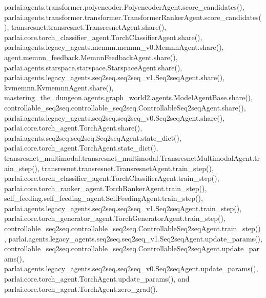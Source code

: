 parlai.\+agents.\+transformer.\+polyencoder.\+Polyencoder\+Agent.\+score\+\_\+candidates(), parlai.\+agents.\+transformer.\+transformer.\+Transformer\+Ranker\+Agent.\+score\+\_\+candidates(), transresnet.\+transresnet.\+Transresnet\+Agent.\+share(), parlai.\+core.\+torch\+\_\+classifier\+\_\+agent.\+Torch\+Classifier\+Agent.\+share(), parlai.\+agents.\+legacy\+\_\+agents.\+memnn.\+memnn\+\_\+v0.\+Memnn\+Agent.\+share(), agent.\+memnn\+\_\+feedback.\+Memnn\+Feedback\+Agent.\+share(), parlai.\+agents.\+starspace.\+starspace.\+Starspace\+Agent.\+share(), parlai.\+agents.\+legacy\+\_\+agents.\+seq2seq.\+seq2seq\+\_\+v1.\+Seq2seq\+Agent.\+share(), kvmemnn.\+Kvmemnn\+Agent.\+share(), mastering\+\_\+the\+\_\+dungeon.\+agents.\+graph\+\_\+world2.\+agents.\+Model\+Agent\+Base.\+share(), controllable\+\_\+seq2seq.\+controllable\+\_\+seq2seq.\+Controllable\+Seq2seq\+Agent.\+share(), parlai.\+agents.\+legacy\+\_\+agents.\+seq2seq.\+seq2seq\+\_\+v0.\+Seq2seq\+Agent.\+share(), parlai.\+core.\+torch\+\_\+agent.\+Torch\+Agent.\+share(), parlai.\+agents.\+seq2seq.\+seq2seq.\+Seq2seq\+Agent.\+state\+\_\+dict(), parlai.\+core.\+torch\+\_\+agent.\+Torch\+Agent.\+state\+\_\+dict(), transresnet\+\_\+multimodal.\+transresnet\+\_\+multimodal.\+Transresnet\+Multimodal\+Agent.\+train\+\_\+step(), transresnet.\+transresnet.\+Transresnet\+Agent.\+train\+\_\+step(), parlai.\+core.\+torch\+\_\+classifier\+\_\+agent.\+Torch\+Classifier\+Agent.\+train\+\_\+step(), parlai.\+core.\+torch\+\_\+ranker\+\_\+agent.\+Torch\+Ranker\+Agent.\+train\+\_\+step(), self\+\_\+feeding.\+self\+\_\+feeding\+\_\+agent.\+Self\+Feeding\+Agent.\+train\+\_\+step(), parlai.\+agents.\+legacy\+\_\+agents.\+seq2seq.\+seq2seq\+\_\+v1.\+Seq2seq\+Agent.\+train\+\_\+step(), parlai.\+core.\+torch\+\_\+generator\+\_\+agent.\+Torch\+Generator\+Agent.\+train\+\_\+step(), controllable\+\_\+seq2seq.\+controllable\+\_\+seq2seq.\+Controllable\+Seq2seq\+Agent.\+train\+\_\+step(), parlai.\+agents.\+legacy\+\_\+agents.\+seq2seq.\+seq2seq\+\_\+v1.\+Seq2seq\+Agent.\+update\+\_\+params(), controllable\+\_\+seq2seq.\+controllable\+\_\+seq2seq.\+Controllable\+Seq2seq\+Agent.\+update\+\_\+params(), parlai.\+agents.\+legacy\+\_\+agents.\+seq2seq.\+seq2seq\+\_\+v0.\+Seq2seq\+Agent.\+update\+\_\+params(), parlai.\+core.\+torch\+\_\+agent.\+Torch\+Agent.\+update\+\_\+params(), and parlai.\+core.\+torch\+\_\+agent.\+Torch\+Agent.\+zero\+\_\+grad().

\mbox{\label{classparlai_1_1agents_1_1legacy__agents_1_1memnn_1_1memnn__v0_1_1MemnnAgent_a459e4d3cc000e2f2458153af7ec83bef}} 
